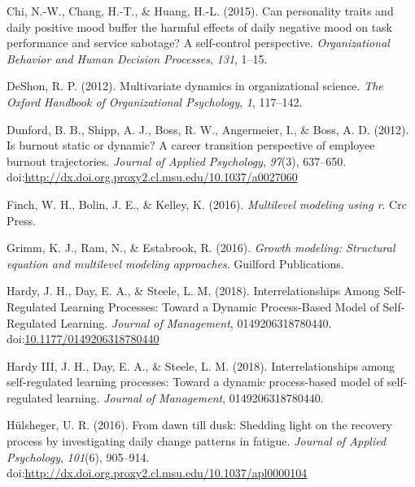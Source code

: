 \documentclass[english,,man]{apa6}
\theoremstyle{definition}
\theoremstyle{definition}
\theoremstyle{definition}
\theoremstyle{remark}
\begin{document}
\leavevmode\hypertarget{ref-chi_can_2015}{}%
Chi, N.-W., Chang, H.-T., \& Huang, H.-L. (2015). Can personality traits
and daily positive mood buffer the harmful effects of daily negative
mood on task performance and service sabotage? A self-control
perspective. \emph{Organizational Behavior and Human Decision
Processes}, \emph{131}, 1--15.

\leavevmode\hypertarget{ref-deshon_multivariate_2012}{}%
DeShon, R. P. (2012). Multivariate dynamics in organizational science.
\emph{The Oxford Handbook of Organizational Psychology}, \emph{1},
117--142.

\leavevmode\hypertarget{ref-dunford_is_2012}{}%
Dunford, B. B., Shipp, A. J., Boss, R. W., Angermeier, I., \& Boss, A.
D. (2012). Is burnout static or dynamic? A career transition perspective
of employee burnout trajectories. \emph{Journal of Applied Psychology},
\emph{97}(3), 637--650.
doi:\href{https://doi.org/http://dx.doi.org.proxy2.cl.msu.edu/10.1037/a0027060}{http://dx.doi.org.proxy2.cl.msu.edu/10.1037/a0027060}

\leavevmode\hypertarget{ref-finch2016multilevel}{}%
Finch, W. H., Bolin, J. E., \& Kelley, K. (2016). \emph{Multilevel
modeling using r}. Crc Press.

\leavevmode\hypertarget{ref-grimm_growth_2016}{}%
Grimm, K. J., Ram, N., \& Estabrook, R. (2016). \emph{Growth modeling:
Structural equation and multilevel modeling approaches}. Guilford
Publications.

\leavevmode\hypertarget{ref-hardy_interrelationships_2018}{}%
Hardy, J. H., Day, E. A., \& Steele, L. M. (2018). Interrelationships
Among Self-Regulated Learning Processes: Toward a Dynamic Process-Based
Model of Self-Regulated Learning. \emph{Journal of Management},
0149206318780440.
doi:\href{https://doi.org/10.1177/0149206318780440}{10.1177/0149206318780440}

\leavevmode\hypertarget{ref-hardy2018}{}%
Hardy III, J. H., Day, E. A., \& Steele, L. M. (2018).
Interrelationships among self-regulated learning processes: Toward a
dynamic process-based model of self-regulated learning. \emph{Journal of
Management}, 0149206318780440.

\leavevmode\hypertarget{ref-hulsheger_dawn_2016}{}%
Hülsheger, U. R. (2016). From dawn till dusk: Shedding light on the
recovery process by investigating daily change patterns in fatigue.
\emph{Journal of Applied Psychology}, \emph{101}(6), 905--914.
doi:\href{https://doi.org/http://dx.doi.org.proxy2.cl.msu.edu/10.1037/apl0000104}{http://dx.doi.org.proxy2.cl.msu.edu/10.1037/apl0000104}
\end{document}
